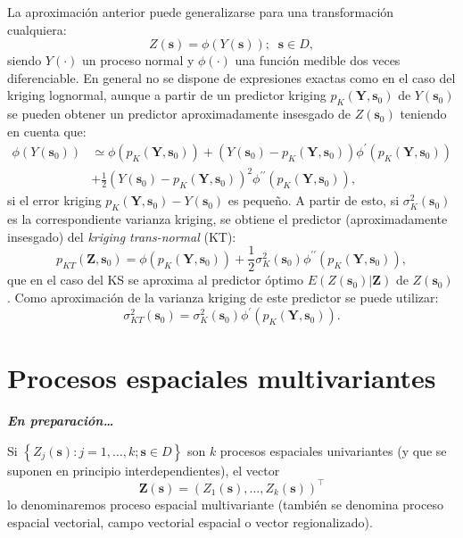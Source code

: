 \documentclass[
]{book}
\theoremstyle{break}
\theoremstyle{definition}
\theoremstyle{definition}
\theoremstyle{definition}
\theoremstyle{definition}
\theoremstyle{remark}
\begin{document}
La aproximación anterior puede generalizarse para una transformación
cualquiera:
\[Z(\mathbf{s})=\phi \left( Y(\mathbf{s})\right) ;\;\;\mathbf{s}\in D,\]
siendo \(Y(\cdot)\) un proceso normal y \(\phi (\cdot)\) una función medible dos veces diferenciable.
En general no se dispone de expresiones exactas como en el caso del kriging lognormal, aunque a partir de un predictor kriging \(p_{K} (\mathbf{Y},\mathbf{s}_{0})\) de \(Y(\mathbf{s}_{0})\) se pueden obtener un predictor aproximadamente insesgado de \(Z(\mathbf{s}_{0})\) teniendo en cuenta que:
\[\begin{aligned}
\phi (Y(\mathbf{s}_{0})) & \simeq \phi (p_{K}(\mathbf{Y},\mathbf{s}_{0}))+(Y(\mathbf{s}_{0})-p_{K}(\mathbf{Y},\mathbf{s}_{0}))\phi^\prime (p_{K}(\mathbf{Y},\mathbf{s}_{0})) \\
 & +\frac{1}{2} (Y(\mathbf{s}_{0})-p_{K}(\mathbf{Y},\mathbf{s}_{0}))^{2} \phi^{\prime\prime} (p_{K}(\mathbf{Y},\mathbf{s}_{0})),
\end{aligned}\]
si el error kriging \(p_{K} (\mathbf{Y},\mathbf{s}_{0})-Y(\mathbf{s}_{0})\) es pequeño.
A partir de esto, si \(\sigma_{K}^{2} (\mathbf{s}_{0})\) es la correspondiente varianza kriging, se obtiene el predictor (aproximadamente insesgado) del \emph{kriging trans-normal} (KT):
\[p_{KT} (\mathbf{Z},\mathbf{s}_{0}) = \phi \left( p_{K}(\mathbf{Y},\mathbf{s}_{0})\right) + \frac{1}{2} \sigma_{K}^{2}(\mathbf{s}_{0}) \phi^{\prime\prime} \left( p_{K}(\mathbf{Y},\mathbf{s}_{0}) \right),\]
que en el caso del KS se aproxima al predictor óptimo \(E\left( \left. Z(\mathbf{s}_{0})\right| \mathbf{Z}\right)\) de \(Z(\mathbf{s}_{0})\).
Como aproximación de la varianza kriging de este predictor se puede utilizar:
\[\sigma_{KT}^{2}(\mathbf{s}_{0}) = \sigma_{K}^{2}(\mathbf{s}_{0}) \phi^{\prime} (p_{K}(\mathbf{Y},\mathbf{s}_{0})).\]

\chapter{Procesos espaciales multivariantes}\label{multivar}

\textbf{\emph{En preparación\ldots{}}}

Si \(\left\{ Z_{j}(\mathbf{s}):j=1, \ldots, k;\mathbf{s}\in D\right\}\)
son \(k\) procesos espaciales univariantes (y que se suponen en principio interdependientes), el vector
\[\mathbf{Z}(\mathbf{s})=(Z_{1}(\mathbf{s}), \ldots, Z_{k}(\mathbf{s}))^\top\]
lo denominaremos proceso espacial multivariante (también se denomina proceso espacial vectorial, campo vectorial espacial o vector regionalizado).
\end{document}
